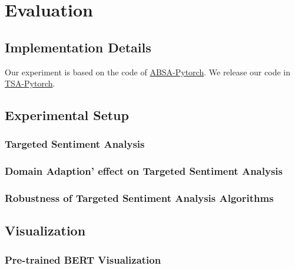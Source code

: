\documentclass[fyp]{socreport}
\begin{document}

\chapter{Evaluation}


\section{Implementation Details}
Our experiment is based on the code of \href{https://github.com/songyouwei/ABSA-PyTorch}{ABSA-Pytorch}. 
We release our code in \href{https://github.com/Xiang-Pan/ABSA-PyTorch}{TSA-Pytorch}.
\section{Experimental Setup}

\subsection{Targeted Sentiment Analysis}

\subsection{Domain Adaption' effect on Targeted Sentiment Analysis}


\subsection{Robustness of Targeted Sentiment Analysis Algorithms}











\section{Visualization}
\subsection{Pre-trained BERT Visualization}
\end{document}
